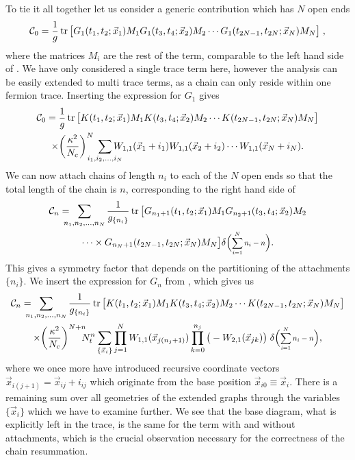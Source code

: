 To tie it all together let us consider a generic contribution which has $N$ open
ends
%
\begin{equation} \label{eq:chain_begin}
  \mathcal{C}_0 = \frac{1}{g} \operatorname{tr} \big[
    G_1(t_1,t_2;\vec{x}_1) M_1 G_1 (t_3,t_4;\vec{x}_2) M_2 \cdots
    G_1 (t_{2N-1},t_{2N};\vec{x}_N) M_N
  \big]\;,
\end{equation}
%
where the matrices $M_i$ are the rest of the term, comparable to the left hand
side of . We have only considered a single trace term
here, however the analysis can be easily extended to multi trace terms, as a
chain can only reside within one fermion trace. Inserting the expression for
$G_1$ gives
%
\begin{multline}
  \mathcal{C}_0 =
    \frac{1}{g} \tr \big[
      K(t_1,t_2;\vec{x}_1) M_1 K(t_3,t_4;\vec{x}_2) M_2
      \cdots K(t_{2N-1},t_{2N};\vec{x}_N) M_N
    \big] \\
  \times \bigg(\frac{\kappa^2}{N_c}\bigg)^N\;\sum_{\mathclap{i_1,i_2,\dots,i_N}}
    W_{1,1}(\vec{x}_1 + i_1) W_{1,1}(\vec{x}_2 + i_2) 
    \cdots W_{1,1}(\vec{x}_N + i_N).
\end{multline}
%
We can now attach chains of length $n_i$ to each of the $N$ open ends so that
the total length of the chain is $n$, corresponding to the right hand side of
%
\begin{multline}
  \mathcal{C}_n =
    \hskip .2cm\sum_{\mathclap{n_1,n_2,\dots,n_N}} \hskip .5cm
      \frac{1}{g_{\{n_i\}}}
      \tr \big[
        G_{n_1 + 1}(t_1,t_2;\vec{x}_1) M_1
        G_{n_2+1} (t_3,t_4;\vec{x}_2) M_2 \\ 
        \cdots \times G_{n_N + 1} (t_{2N-1},t_{2N};\vec{x}_N) M_N
      \big]
    \delta\Big(\scalemath{0.8}{\sum_{i=1}^N n_i - n}\Big).
\end{multline}
%
This gives a symmetry factor that depends on the partitioning of the attachments
$\{n_i\}$.  We insert the expression for $G_n$ from , which
gives us
%
\begin{multline}
  \mathcal{C}_n =
    \hskip .2cm\sum_{\mathclap{n_1,n_2,\dots,n_N}} \hskip .5cm
      \frac{1}{g_{\{n_i\}}}
      \tr \big[
        K(t_1,t_2;\vec{x}_1) M_1 K(t_3,t_4;\vec{x}_2) M_2 \cdots
        K(t_{2N-1},t_{2N};\vec{x}_N) M_N
      \big]\\
  \times \bigg(\frac{\kappa^2}{N_c}\bigg)^{N+\mathrlap{n}}
    N_{t}^n \sum_{\{\vec{x}_i\}} \prod_{j=1}^N W_{1,1}(\vec{x}_{j (n_j+1)})
    \prod_{k=0}^{n_j} \big(-W_{2,1}(\vec{x}_{j k})\big) \;
    \delta\Big(\scalemath{0.8}{\sum_{i=1}^N n_i - n}\Big),
\end{multline}
%
where we once more have introduced recursive coordinate vectors
$\vec{x}_{i(j+1)} = \vec{x}_{ij} + i_{ij}$ which originate from the base
position $\vec{x}_{i0} \equiv \vec{x}_i$. There is a remaining sum over all
geometries of the extended graphs through the variables $\{\vec{x}_i\}$ which we
have to examine further.  We see that the base diagram, what is explicitly left
in the trace, is the same for the term with and without attachments, which is
the crucial observation necessary for the correctness of the chain resummation.

